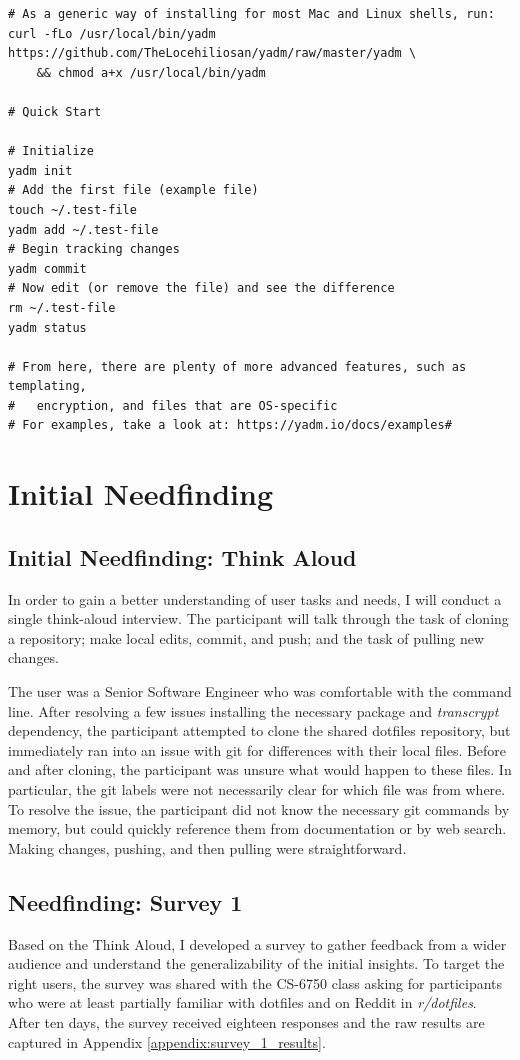 \documentclass[letterpaper]{jdf}
\begin{document}
\newpage
\begin{verbatim}
# As a generic way of installing for most Mac and Linux shells, run:
curl -fLo /usr/local/bin/yadm https://github.com/TheLocehiliosan/yadm/raw/master/yadm \
    && chmod a+x /usr/local/bin/yadm

# Quick Start

# Initialize
yadm init
# Add the first file (example file)
touch ~/.test-file
yadm add ~/.test-file
# Begin tracking changes
yadm commit
# Now edit (or remove the file) and see the difference
rm ~/.test-file
yadm status

# From here, there are plenty of more advanced features, such as templating,
#   encryption, and files that are OS-specific
# For examples, take a look at: https://yadm.io/docs/examples#
\end{verbatim}

\section{Initial Needfinding}

\subsection{Initial Needfinding: Think Aloud}
In order to gain a better understanding of user tasks and needs, I will conduct a single think-aloud interview. The participant will talk through the task of cloning a repository; make local edits, commit, and push; and the task of pulling new changes.

The user was a Senior Software Engineer who was comfortable with the command line. After resolving a few issues installing the necessary package and \emph{transcrypt} dependency, the participant attempted to clone the shared dotfiles repository, but immediately ran into an issue with git for differences with their local files. Before and after cloning, the participant was unsure what would happen to these files. In particular, the git labels were not necessarily clear for which file was from where. To resolve the issue, the participant did not know the necessary git commands by memory, but could quickly reference them from documentation or by web search. Making changes, pushing, and then pulling were straightforward.

\subsection{Needfinding: Survey 1}
Based on the Think Aloud, I developed a survey to gather feedback from a wider audience and understand the generalizability of the initial insights. To target the right users, the survey was shared with the CS-6750 class asking for participants who were at least partially familiar with dotfiles and on Reddit in \emph{r/dotfiles}. After ten days, the survey received eighteen responses and the raw results are captured in Appendix \ref{appendix:survey_1_results}.
\end{document}
